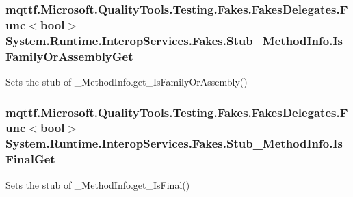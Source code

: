\hypertarget{class_system_1_1_runtime_1_1_interop_services_1_1_fakes_1_1_stub___method_info_a873343aecd8dc0f40411f7486ff40f5f}{
\subsubsection[{Is\-Family\-Or\-Assembly\-Get}]{\setlength{\rightskip}{0pt plus 5cm}mqttf.\-Microsoft.\-Quality\-Tools.\-Testing.\-Fakes.\-Fakes\-Delegates.\-Func$<$bool$>$ System.\-Runtime.\-Interop\-Services.\-Fakes.\-Stub\-\_\-\-Method\-Info.\-Is\-Family\-Or\-Assembly\-Get}}\label{class_system_1_1_runtime_1_1_interop_services_1_1_fakes_1_1_stub___method_info_a873343aecd8dc0f40411f7486ff40f5f}


Sets the stub of \-\_\-\-Method\-Info.\-get\-\_\-\-Is\-Family\-Or\-Assembly()

\hypertarget{class_system_1_1_runtime_1_1_interop_services_1_1_fakes_1_1_stub___method_info_adfb2c60ca6cc7bb7446324fc7b78a79f}{
\subsubsection[{Is\-Final\-Get}]{\setlength{\rightskip}{0pt plus 5cm}mqttf.\-Microsoft.\-Quality\-Tools.\-Testing.\-Fakes.\-Fakes\-Delegates.\-Func$<$bool$>$ System.\-Runtime.\-Interop\-Services.\-Fakes.\-Stub\-\_\-\-Method\-Info.\-Is\-Final\-Get}}\label{class_system_1_1_runtime_1_1_interop_services_1_1_fakes_1_1_stub___method_info_adfb2c60ca6cc7bb7446324fc7b78a79f}


Sets the stub of \-\_\-\-Method\-Info.\-get\-\_\-\-Is\-Final()

